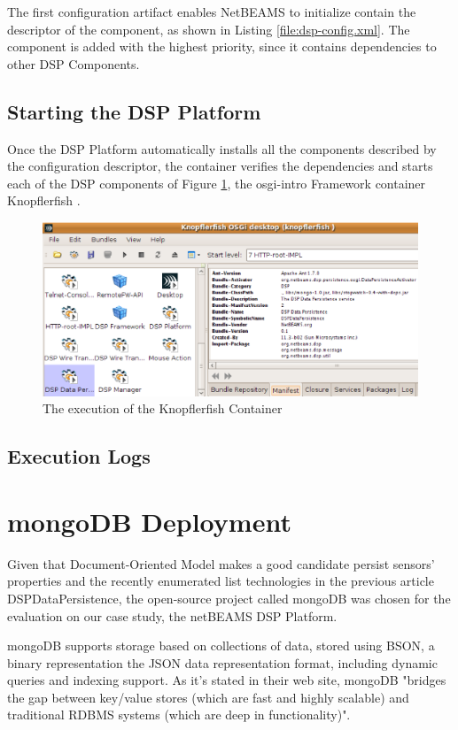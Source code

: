 The first configuration artifact enables NetBEAMS to initialize contain the
descriptor of the component, as shown in Listing \ref{file:dsp-config.xml}.
The component is added with the highest priority, since it contains
dependencies to other DSP Components. 
\subsection{Starting the DSP Platform}

Once the DSP Platform automatically installs all the components described by
the configuration descriptor, the container verifies the dependencies and
starts each of the DSP components of Figure \ref{fig:knopflerfish-execution},
the osgi-intro Framework container Knopflerfish \cite{knopflerfish}.

\begin{figure}[!t]
  \centering
  \includegraphics[scale=0.65]{../diagrams/knopflerfish-execution}
  \caption{The execution of the Knopflerfish Container}
  \label{fig:knopflerfish-execution}
\end{figure}

\subsection{Execution Logs}

\section{mongoDB Deployment}

Given that Document-Oriented Model makes a good candidate persist sensors'
properties and the recently enumerated list technologies in the previous
article DSPDataPersistence, the open-source project called mongoDB was chosen
for the evaluation on our case study, the netBEAMS DSP Platform.

mongoDB supports storage based on collections of data, stored using BSON, a
binary representation the JSON data representation format, including dynamic
queries and indexing support. As it's stated in their web site, mongoDB
"bridges the gap between key/value stores (which are fast and highly scalable)
and traditional RDBMS systems (which are deep in functionality)".

